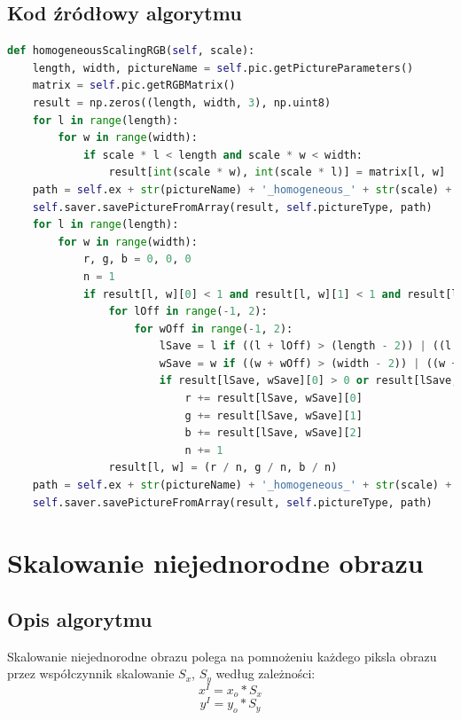 \documentclass[a4paper,12pt, titlepage]{report}
\begin{document}
\subsection*{Kod źródłowy algorytmu}
\begin{lstlisting}[language=Python]
def homogeneousScalingRGB(self, scale):
    length, width, pictureName = self.pic.getPictureParameters()
    matrix = self.pic.getRGBMatrix()
    result = np.zeros((length, width, 3), np.uint8)
    for l in range(length):
        for w in range(width):
            if scale * l < length and scale * w < width:
                result[int(scale * w), int(scale * l)] = matrix[l, w]
    path = self.ex + str(pictureName) + '_homogeneous_' + str(scale) + '_withoutInterpolation.png'
    self.saver.savePictureFromArray(result, self.pictureType, path)
    for l in range(length):
        for w in range(width):
            r, g, b = 0, 0, 0
            n = 1
            if result[l, w][0] < 1 and result[l, w][1] < 1 and result[l, w][2] < 1:
                for lOff in range(-1, 2):
                    for wOff in range(-1, 2):
                        lSave = l if ((l + lOff) > (length - 2)) | ((l + lOff) < 0) else (l + lOff)
                        wSave = w if ((w + wOff) > (width - 2)) | ((w + wOff) < 0) else (w + wOff)
                        if result[lSave, wSave][0] > 0 or result[lSave, wSave][1] > 0 or result[lSave, wSave][2] > 0:
                            r += result[lSave, wSave][0]
                            g += result[lSave, wSave][1]
                            b += result[lSave, wSave][2]
                            n += 1
                result[l, w] = (r / n, g / n, b / n)
    path = self.ex + str(pictureName) + '_homogeneous_' + str(scale) + '_withInterpolation.png'
    self.saver.savePictureFromArray(result, self.pictureType, path)
\end{lstlisting}

\section{Skalowanie niejednorodne obrazu}
\subsection*{Opis algorytmu}
\par Skalowanie niejednorodne obrazu polega na pomnożeniu każdego piksla obrazu przez współczynnik skalowanie \(S_{x}\), \(S_{y}\) według zależności:\[x^{I}=x_{o}*S_{x}\]\[y^{I}=y_{o}*S_{y}\]
\end{document}
